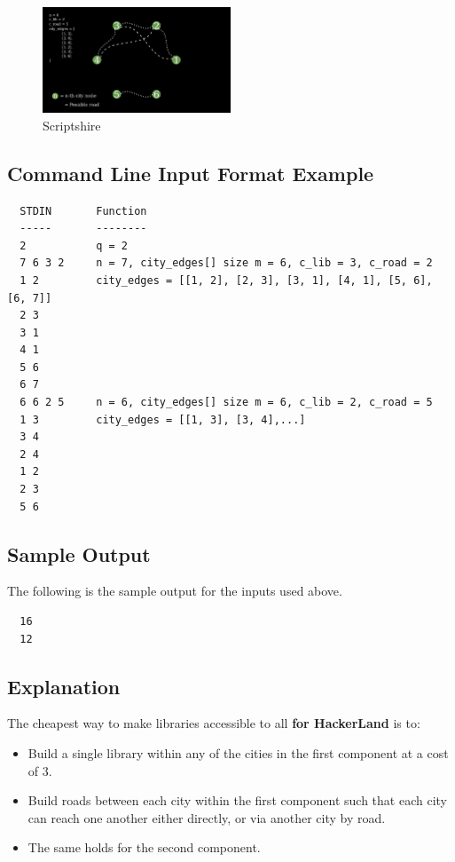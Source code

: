 \documentclass[11pt, a4paper, oneside]{article}
\begin{document}
\begin{figure}[H]
  \centering
  \includegraphics[width=0.5\textwidth]{scriptshire-graph.png}
  \caption{Scriptshire}
  \label{fig:image2}
\end{figure}

\subsection*{Command Line Input Format Example}

\begin{verbatim}
  STDIN       Function
  -----       --------
  2           q = 2
  7 6 3 2     n = 7, city_edges[] size m = 6, c_lib = 3, c_road = 2
  1 2         city_edges = [[1, 2], [2, 3], [3, 1], [4, 1], [5, 6], [6, 7]]
  2 3
  3 1
  4 1
  5 6
  6 7
  6 6 2 5     n = 6, city_edges[] size m = 6, c_lib = 2, c_road = 5
  1 3         city_edges = [[1, 3], [3, 4],...]
  3 4
  2 4
  1 2
  2 3
  5 6
\end{verbatim}

\subsection*{Sample Output}

The following is the sample output for the inputs used above.

\begin{verbatim}
  16
  12
\end{verbatim}

\subsection*{Explanation}

The cheapest way to make libraries accessible to all \textbf{for HackerLand} is to:

\begin{itemize}
  \item Build a single library within any of the cities in the first component at a cost of \(3\).
  \item Build roads between each city within the first component such that each city can reach one another either directly, or via another city by road.
  \item The same holds for the second component.
\end{itemize}
\end{document}
